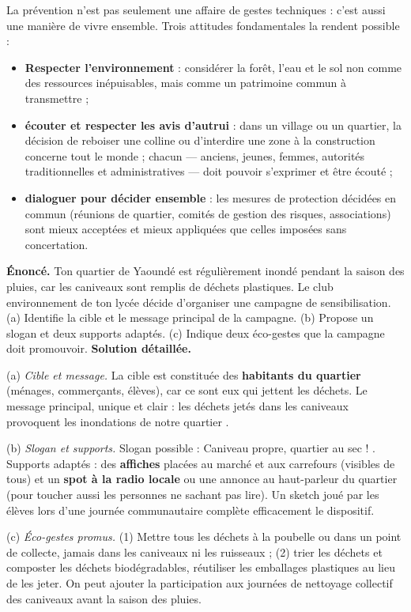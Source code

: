\documentclass[11pt]{article}
\begin{document}
La prévention n'est pas seulement une affaire de gestes techniques : c'est aussi une manière de vivre ensemble. Trois attitudes fondamentales la rendent possible :

\begin{itemize}
\item \textbf{Respecter l'environnement} : considérer la forêt, l'eau et le sol non comme des ressources inépuisables, mais comme un patrimoine commun à transmettre ;
\item \textbf{écouter et respecter les avis d'autrui} : dans un village ou un quartier, la décision de reboiser une colline ou d'interdire une zone à la construction concerne tout le monde ; chacun — anciens, jeunes, femmes, autorités traditionnelles et administratives — doit pouvoir s'exprimer et être écouté ;
\item \textbf{dialoguer pour décider ensemble} : les mesures de protection décidées en commun (réunions de quartier, comités de gestion des risques, associations) sont mieux acceptées et mieux appliquées que celles imposées sans concertation.
\end{itemize}

\begin{exoresolu}
\textbf{Énoncé.} Ton quartier de Yaoundé est régulièrement inondé pendant la saison des pluies, car les caniveaux sont remplis de déchets plastiques. Le club environnement de ton lycée décide d'organiser une campagne de sensibilisation. (a) Identifie la cible et le message principal de la campagne. (b) Propose un slogan et deux supports adaptés. (c) Indique deux éco-gestes que la campagne doit promouvoir.
\tcblower
\textbf{Solution détaillée.}

(a) \emph{Cible et message.} La cible est constituée des \textbf{habitants du quartier} (ménages, commerçants, élèves), car ce sont eux qui jettent les déchets. Le message principal, unique et clair : \og les déchets jetés dans les caniveaux provoquent les inondations de notre quartier \fg.

(b) \emph{Slogan et supports.} Slogan possible : \og Caniveau propre, quartier au sec ! \fg. Supports adaptés : des \textbf{affiches} placées au marché et aux carrefours (visibles de tous) et un \textbf{spot à la radio locale} ou une annonce au haut-parleur du quartier (pour toucher aussi les personnes ne sachant pas lire). Un sketch joué par les élèves lors d'une journée communautaire complète efficacement le dispositif.

(c) \emph{Éco-gestes promus.} (1) Mettre tous les déchets à la poubelle ou dans un point de collecte, jamais dans les caniveaux ni les ruisseaux ; (2) trier les déchets et composter les déchets biodégradables, réutiliser les emballages plastiques au lieu de les jeter. On peut ajouter la participation aux journées de nettoyage collectif des caniveaux avant la saison des pluies.
\end{exoresolu}
\end{document}
